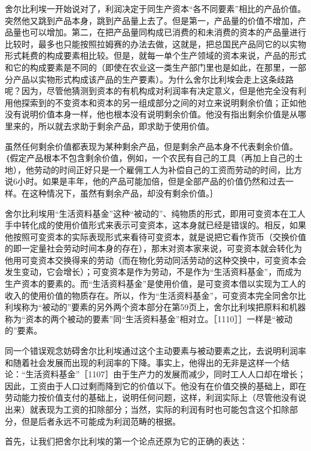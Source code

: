 舍尔比利埃一开始说对了，利润决定于同生产资本“各不同要素”相比的产品价值。突然他又跳到产品本身，跳到产品量上去了。但是第一，产品量的价值不增加，产品量也可以增加。第二，在把产品量同构成已消费的和未消费的资本的产品量进行比较时，最多也只能按照拉姆赛的办法去做，这就是，把总国民产品同它的以实物形式耗费的构成要素相比较。但是，就每一单个生产领域的资本来说，产品的形式和它的构成要素是不同的（即使在农业这一类生产部门里也是如此，在那里，一部分产品以实物形式构成该产品的生产要素）。为什么舍尔比利埃会走上这条歧路呢？因为，尽管他猜测到资本的有机构成对利润率有决定意义，但是他完全没有利用他探索到的不变资本和资本的另一组成部分之间的对立来说明剩余价值；正如他没有说明价值本身一样，他也根本没有说明剩余价值。他没有指出剩余价值是从哪里来的，所以就去求助于剩余产品，即求助于使用价值。

虽然任何剩余价值都表现为某种剩余产品，但是剩余产品本身不代表剩余价值。｛假定产品根本不包含剩余价值，例如，一个农民有自己的工具（再加上自己的土地），他劳动的时间正好只是一个雇佣工人为补偿自己的工资而劳动的时间，比方说6小时。如果是丰年，他的产品可能加倍，但是全部产品的价值仍然和过去一样。在这种情况下，虽然有剩余产品，却没有剩余价值。｝

舍尔比利埃用“生活资料基金”这种“被动的”、纯物质的形式，即用可变资本在工人手中转化成的使用价值形式来表示可变资本，这本身就已经是错误的。相反，如果他按照可变资本的实际表现形式来看待可变资本，就是说把它看作货币（交换价值的即一定量社会劳动时间本身的存在），那末对资本家来说，可变资本就会转化为他用可变资本交换得来的劳动（而在物化劳动同活劳动的这种交换中，可变资本会发生变动，它会增长）；可变资本是作为劳动，不是作为“生活资料基金”，而成为生产资本的要素的。而“生活资料基金”是使用价值，是可变资本借以实现为工人的收入的使用价值的物质存在。所以，作为“生活资料基金”，可变资本完全同舍尔比利埃称为“被动的”要素的另外两个资本部分在第59页上，舍尔比利埃把原料和机器称为“资本的两个被动的要素”同“生活资料基金”相对立。［1110］］一样是“被动的”要素。

同一个错误观念妨碍舍尔比利埃通过这个主动要素与被动要素之比，去说明利润率和随着社会发展而出现的利润率的下降。事实上，他得出的无非是这样一个结论：“生活资料基金”［1107］由于生产力的发展而减少，同时工人人口却在增长；因此，工资由于人口过剩而降到它的价值以下。他没有在价值交换的基础上，即在劳动能力按价值支付的基础上，说明任何问题，这样，利润实际上（尽管他没有说出来）就表现为工资的扣除部分；当然，实际的利润有时也可能包含这个扣除部分，但是后者永远不可能成为利润范畴的根据。

首先，让我们把舍尔比利埃的第一个论点还原为它的正确的表达：

